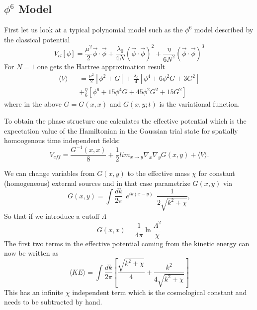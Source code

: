 \documentclass[a4paper,prd,preprint,superscriptaddress,showpacs,byrevtex]{revtex4}
\begin{document}
\subsection {$\phi^6$ Model}
First let us look at a typical polynomial model such as
the $\phi^6$ model described by the classical potential
\begin{equation}
V_{cl}[\phi] = \frac{\mu^2}{2} \vec \phi \cdot \vec \phi + \frac
{\lambda_0}{4
N} (\vec \phi \cdot \vec \phi)^2 + \frac{\eta}{6 N^2} (\vec \phi \cdot \vec
\phi)^3
 \end{equation}
For $N=1$ one gets the Hartree approximation result
\begin{eqnarray}
\langle V \rangle && = \frac{\mu^2}{2} [\phi^2 + G] + \frac {\lambda_0}{4}
[ \phi^4 + 6 \phi^2 G + 3 G^2 ] \nonumber \\
&& +  \frac{\eta}{6} [\phi^6+ 15 \phi^4 G + 45 \phi^2 G^2 + 15 G^2]
\end{eqnarray}
where in the above $G= G(x,x)$ and $G(x,y;t)$ is the variational function.

To obtain the phase structure  one calculates the
effective potential which is the expectation value of the Hamiltonian in the
Gaussian trial state for spatially homoogenous time independent fields:
\begin{equation}
V_{eff}= \frac{G^{-1}(x,x)}{8}+ \frac{1}{2} lim_{x \rightarrow y} \nabla_x
\nabla_y G(x,y) + \langle V \rangle.
\end{equation}

We can change variables from $G(x,y)$ to the effective mass $\chi$ for
constant (homogeneous) external sources and in that case parametrize
$G(x,y)$
via
\begin{equation}
G(x,y) = \int \frac{dk} {2 \pi} ~~e^{i k(x-y)} ~~\frac {1} {2
\sqrt{k^2+\chi}},
\end{equation}
So that if we introduce a cutoff $\Lambda$
\begin{equation}
G(x,x) = \frac{1}{4 \pi} \ln \frac{\Lambda^2}{\chi}
\end{equation}
The first two terms in the effective potential coming from the kinetic
energy
can now be written as
\begin{equation}
\langle KE \rangle = \int \frac{dk} {2 \pi} [ \frac {\sqrt{k^2+\chi}}{4} +
\frac{k^2} {4 \sqrt{k^2+\chi}} ] \end{equation}
This has an infinite $\chi$ independent term which is the cosmological
constant
and needs to be subtracted by hand.
\end{document}
